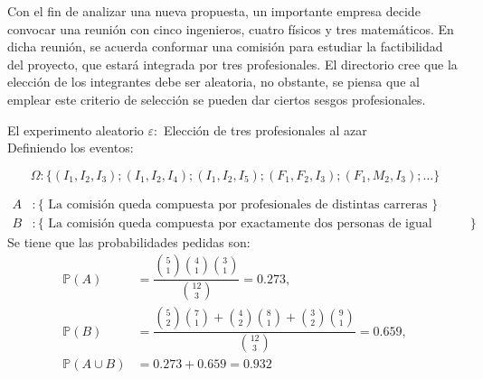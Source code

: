 
\addpoints
\question[15] Con el fin de analizar una nueva propuesta, un importante empresa decide convocar una reunión con cinco ingenieros, cuatro físicos y tres matemáticos. En dicha reunión, se acuerda conformar una comisión para estudiar la factibilidad del proyecto, que estará integrada por tres profesionales. El directorio cree que la elección de los integrantes debe ser aleatoria, no obstante, se piensa que al emplear este criterio de selección se pueden dar ciertos sesgos profesionales. 

\noaddpoints


\begin{solution}
El experimento aleatorio $\varepsilon:$ Elección de tres profesionales al azar\\

Definiendo los eventos:

$$\Omega: \{ (I_1,I_2,I_3); (I_1,I_2,I_4); (I_1,I_2,I_5); (F_1,F_2,I_3); (F_1,M_2,I_3);\dots\}$$

\begin{align*}
A&:\{ \text{ La comisión queda compuesta por profesionales de distintas carreras }\}\\
B&:\{ \text{ La comisión queda compuesta por exactamente dos personas de igual profesión }\}\
\end{align*}
Se tiene que las probabilidades pedidas son:
\begin{align*}
\mathbb{P}(A)&=\dfrac{\binom{5}{1}\binom{4}{1}\binom{3}{1}}{\binom{12}{3}}=0.273,\\
\mathbb{P}(B)&=\dfrac{\binom{5}{2}\binom{7}{1}+\binom{4}{2}\binom{8}{1}+\binom{3}{2}\binom{9}{1}}{\binom{12}{3}}=0.659,\\
\mathbb{P}(A\cup B)&=0.273+0.659=0.932
\end{align*}
\end{solution}